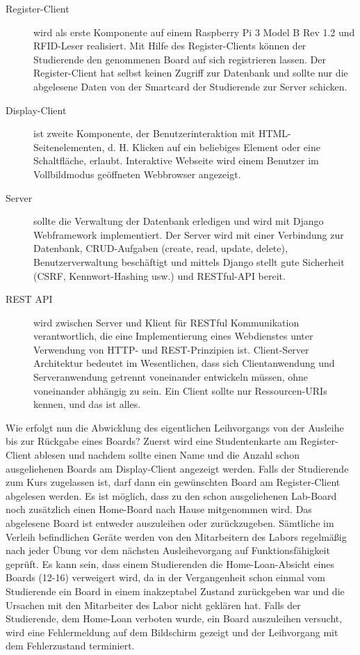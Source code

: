 \begin{description}
	\item [Register-Client] wird als erste Komponente  auf einem Raspberry Pi 3 Model B Rev 1.2 und RFID-Leser realisiert. Mit Hilfe des Register-Clients können der Studierende den genommenen Board auf sich registrieren lassen. Der Register-Client hat selbst keinen Zugriff zur Datenbank und sollte nur die abgelesene Daten von der Smartcard der Studierende zur Server schicken. 
	\item [Display-Client] ist zweite Komponente, der Benutzerinteraktion mit HTML-Seitenelementen, d. H. Klicken auf ein beliebiges Element oder eine Schaltfläche, erlaubt. Interaktive Webseite wird einem Benutzer im Vollbildmodus geöffneten Webbrowser angezeigt.
	\item [Server] sollte die Verwaltung der Datenbank erledigen und wird mit Django Webframework implementiert. Der Server wird mit einer Verbindung zur Datenbank, CRUD-Aufgaben (create, read, update, delete), Benutzerverwaltung beschäftigt und mittels Django stellt gute Sicherheit (CSRF, Kennwort-Hashing usw.) und RESTful-API bereit.
	\item [REST API] wird zwischen Server und Klient für RESTful Kommunikation verantwortlich, die eine Implementierung eines Webdienstes unter Verwendung von HTTP- und REST-Prinzipien ist. Client-Server Architektur bedeutet im Wesentlichen, dass sich Clientanwendung und Serveranwendung getrennt voneinander entwickeln müssen, ohne voneinander abhängig zu sein. Ein Client sollte nur Ressourcen-URIs kennen, und das ist alles.
\end{description}

Wie erfolgt nun die Abwicklung des eigentlichen Leihvorgangs von der Ausleihe bis zur Rückgabe eines Boards?  Zuerst wird eine Studentenkarte am Register-Client ablesen und nachdem sollte einen Name und die Anzahl schon ausgeliehenen Boards am Display-Client angezeigt werden. Falls der Studierende zum Kurs zugelassen ist, darf dann ein gewünschten Board am Register-Client abgelesen werden. Es ist möglich, dass zu den schon ausgeliehenen Lab-Board noch zusätzlich einen Home-Board nach Hause mitgenommen wird. Das abgelesene Board ist entweder auszuleihen oder zurückzugeben. Sämtliche im Verleih befindlichen Geräte werden von den Mitarbeitern des Labors regelmäßig nach jeder Übung vor dem nächsten Ausleihevorgang auf Funktionsfähigkeit geprüft. Es kann sein, dass einem Studierenden die Home-Loan-Absicht eines Boards (12-16) verweigert wird, da in der Vergangenheit schon einmal vom Studierende ein Board in einem inakzeptabel Zustand zurückgeben war und die Ursachen mit den Mitarbeiter des Labor nicht geklären hat. Falls der Studierende, dem Home-Loan verboten wurde, ein Board auszuleihen versucht, wird eine Fehlermeldung auf dem Bildschirm gezeigt und der Leihvorgang mit dem Fehlerzustand terminiert.  

